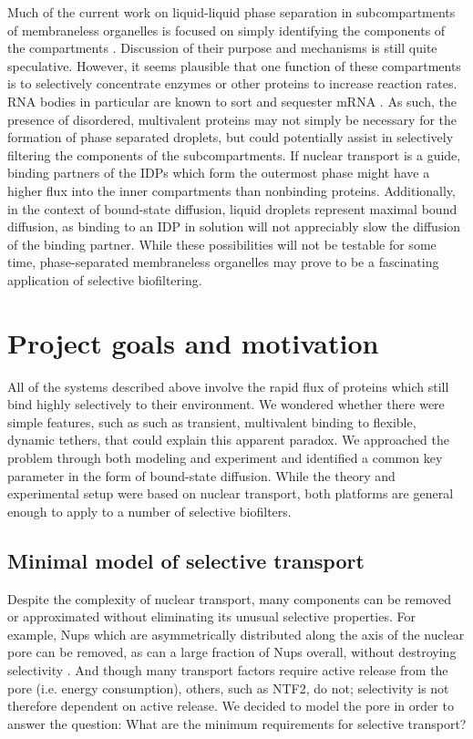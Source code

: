 Much of the current work on liquid-liquid phase separation in subcompartments of membraneless organelles is focused on simply identifying the components of the compartments \cite{oday19}.  Discussion of their purpose and mechanisms is still quite speculative.  However, it seems plausible that one function of these compartments is to selectively concentrate enzymes or other proteins to increase reaction rates.  RNA bodies in particular are known to sort and sequester mRNA \cite{shiina19}.  As such, the presence of disordered, multivalent proteins may not simply be necessary for the formation of phase separated droplets, but could potentially assist in selectively filtering the components of the subcompartments.  If nuclear transport is a guide, binding partners of the IDPs which form the outermost phase might have a higher flux into the inner compartments than nonbinding proteins.  Additionally, in the context of bound-state diffusion, liquid droplets represent maximal bound diffusion, as binding to an IDP in solution will not appreciably slow the diffusion of the binding partner.  While these possibilities will not be testable for some time, phase-separated membraneless organelles may prove to be a fascinating application of selective biofiltering.

\section{Project goals and motivation}

All of the systems described above involve the rapid flux of proteins which still bind highly selectively to their environment.  We wondered whether there were simple features, such as
such as transient, multivalent binding to flexible, dynamic tethers, that could explain this apparent paradox.   We approached the problem through both modeling and experiment and identified a common key parameter in the form of bound-state diffusion.  While the theory and experimental setup were based on nuclear transport, both platforms are general enough to apply to a number of selective biofilters.

\subsection{Minimal model of selective transport}

Despite the complexity of nuclear transport, many components can be removed or approximated without eliminating its unusual selective properties.   For example, Nups which are asymmetrically distributed along the axis of the nuclear pore can be removed, as can a large fraction of Nups overall, without destroying selectivity \cite{strawn04, zeitler04,kowalczyk11, jovanovic-talisman09}.  And though many transport factors require active release from the pore (i.e. energy consumption), others, such as NTF2, do not; selectivity is not therefore dependent on active release.  We decided to model the pore in order to answer the question: What are the minimum requirements for selective transport?

